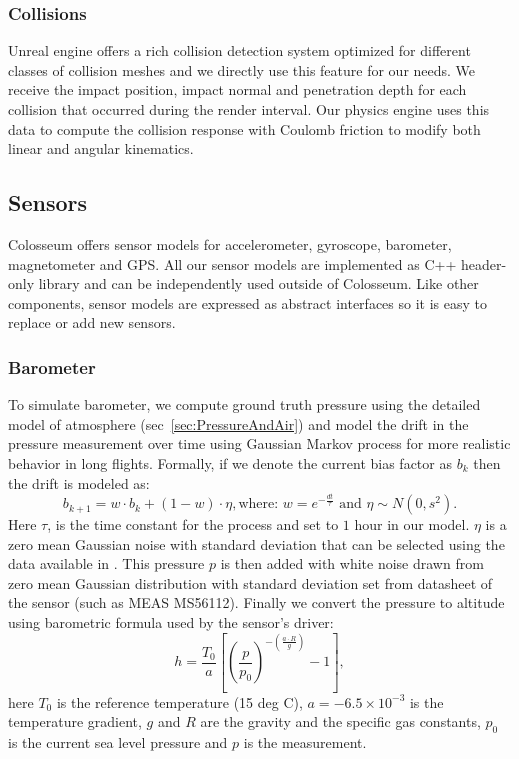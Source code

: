 \documentclass[graybox]{svmult}
\begin{document}
	\subsubsection{Collisions}
	Unreal engine offers a rich collision detection system optimized for different classes of collision meshes and we directly use this feature for our needs. We receive the impact position, impact normal and penetration depth for each collision that occurred during the render interval. Our physics engine uses this data to compute the collision response with Coulomb friction to modify both linear and angular kinematics.\cite{hecker1997physics}
	
	\subsection{Sensors}
	Colosseum offers sensor models for accelerometer, gyroscope, barometer, magnetometer and GPS. All our sensor models are implemented as C++ header-only library and can be independently used outside of Colosseum. Like other components, sensor models are expressed as abstract interfaces so it is easy to replace or add new sensors.
	
	\subsubsection{Barometer}
	To simulate barometer, we compute ground truth pressure using the detailed model of atmosphere (sec~\ref{sec:PressureAndAir}) and model the drift in the pressure measurement over time using Gaussian Markov process \cite{sabatini2013stochastic} for more realistic behavior in long flights. Formally, if we denote the current bias factor as $b_k$ then the drift is modeled as:
	\begin{equation*}
	b_{k+1} = w\cdot b_k + (1-w)\cdot\eta, \mbox{where: } w = e^{- \frac{dt}{\tau}} \mbox{ and } \eta\sim N(0,s^2).
	\end{equation*}
	Here $\tau$, is the time constant for the process and set to $1$ hour in our model. $\eta$ is a zero mean Gaussian noise with standard deviation that can be selected using the data available in \cite{Burch2014}. This pressure $p$ is then added with white noise drawn from zero mean Gaussian distribution with standard deviation set from datasheet of the sensor (such as MEAS MS56112). Finally we convert the pressure to altitude using barometric formula used by the sensor's driver:
	\begin{equation*}
	h = \frac{T_{0}}{a} \left[\left(\frac{p}{p_{0}}\right)^{-(\frac{a \cdot R}{g})} - 1 \right],
	\end{equation*}
	here $T_{0}$ is the reference temperature (15 deg C), $a = -6.5 \times 10^{-3}$ is the temperature gradient, $g$ and $R$ are the gravity and the specific gas constants, $p_{0}$ is the current sea level pressure and $p$ is the measurement.
	
\end{document}
